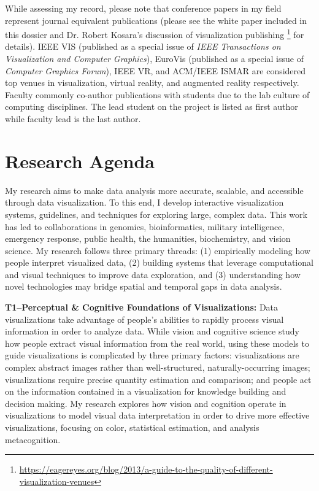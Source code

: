 \documentclass[11pt]{article}
\begin{document}
While assessing my record, please note that conference papers in my field represent journal equivalent publications (please see the white paper included in this dossier and Dr. Robert Kosara's discussion of visualization publishing \footnote{\url{https://eagereyes.org/blog/2013/a-guide-to-the-quality-of-different-visualization-venues}} for details). IEEE VIS (published as a special issue of \emph{IEEE Transactions on Visualization and Computer Graphics}), EuroVis (published as a special issue of \emph{Computer Graphics Forum}), IEEE VR, and ACM/IEEE ISMAR are considered top venues in visualization, virtual reality, and augmented reality respectively. Faculty commonly co-author publications with students due to the lab culture of computing disciplines. The lead student on the project is listed as first author while faculty lead is the last author. 




\section*{Research Agenda}
My research aims to make data analysis more accurate, scalable, and accessible through data visualization. To this end, I develop interactive visualization systems, guidelines, and techniques for exploring large, complex data. This work has led to collaborations in genomics, bioinformatics, military intelligence, emergency response, public health, the humanities, biochemistry, and vision science. My research follows three primary threads: (1) empirically modeling how people interpret visualized data, (2) building systems that leverage computational and visual techniques to improve data exploration, and (3) understanding how novel technologies may bridge spatial and temporal gaps in data analysis. 

\textbf{T1--Perceptual \& Cognitive Foundations of Visualizations: }
Data visualizations take advantage of people's abilities to rapidly process visual information in order to analyze data. While vision and cognitive science study how people extract visual information from the real world, using these models to guide visualizations is complicated by three primary factors: visualizations are complex abstract images rather than well-structured, naturally-occurring images; visualizations require precise quantity estimation and comparison; and people act on the information contained in a visualization for knowledge building and decision making. My research explores how vision and cognition operate in visualizations to model visual data interpretation in order to drive more effective visualizations, focusing on color, statistical estimation, and analysis metacognition. 
\end{document}
